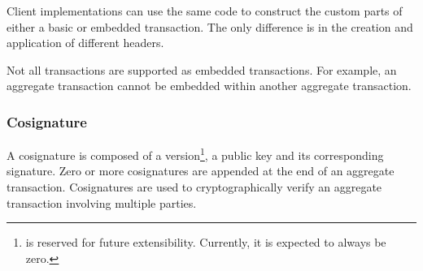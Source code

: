 Client implementations can use the same code to construct the custom parts of either a basic or embedded transaction.
The only difference is in the creation and application of different headers.

Not all transactions are supported as embedded transactions.
For example, an aggregate transaction cannot be embedded within another aggregate transaction.

\begin{figure}[H]
\end{figure}

\subsubsection{Cosignature}

A cosignature is composed of a version\footnote{ is reserved for future extensibility. Currently, it is expected to always be zero.}, a public key and its corresponding signature.
Zero or more cosignatures are appended at the end of an aggregate transaction.
Cosignatures are used to cryptographically verify an aggregate transaction involving multiple parties.

\begin{figure}[H]
\end{figure}

